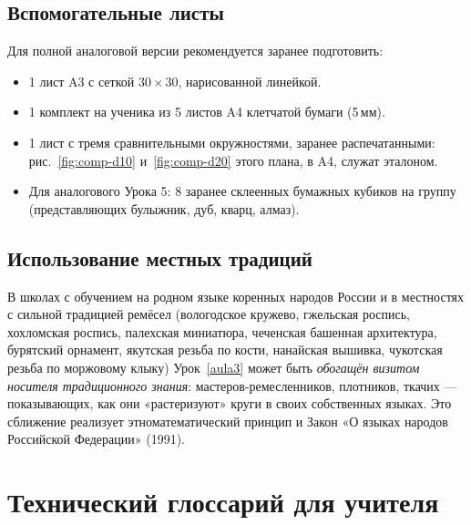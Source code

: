 \documentclass[12pt,a4paper]{scrartcl}
\begin{document}
\subsection{Вспомогательные листы}
Для полной аналоговой версии рекомендуется заранее подготовить:
\begin{itemize}[leftmargin=1.3em,itemsep=0.1em,topsep=0.2em,nosep]
  \item 1 лист A3 с сеткой $30 \times 30$, нарисованной линейкой.
  \item 1 комплект на ученика из 5 листов A4 клетчатой бумаги (5\,мм).
  \item 1 лист с тремя сравнительными окружностями, заранее распечатанными: рис.~\ref{fig:comp-d10} и~\ref{fig:comp-d20} этого плана, в A4, служат эталоном.
  \item Для аналогового Урока 5: 8 заранее склеенных бумажных кубиков на группу (представляющих булыжник, дуб, кварц, алмаз).
\end{itemize}

\subsection{Использование местных традиций}
В школах с обучением на родном языке коренных народов России и в местностях с сильной традицией ремёсел (вологодское кружево, гжельская роспись, хохломская роспись, палехская миниатюра, чеченская башенная архитектура, бурятский орнамент, якутская резьба по кости, нанайская вышивка, чукотская резьба по моржовому клыку) Урок~\ref{aula3} может быть \emph{обогащён визитом носителя традиционного знания}: мастеров-ремесленников, плотников, ткачих --- показывающих, как они «растеризуют» круги в своих собственных языках. Это сближение реализует этно\-мате\-ма\-ти\-чес\-кий принцип и Закон «О языках народов Российской Федерации» (1991).

\newpage
\section{Технический глоссарий для учителя}\label{ap:glos}
\end{document}
